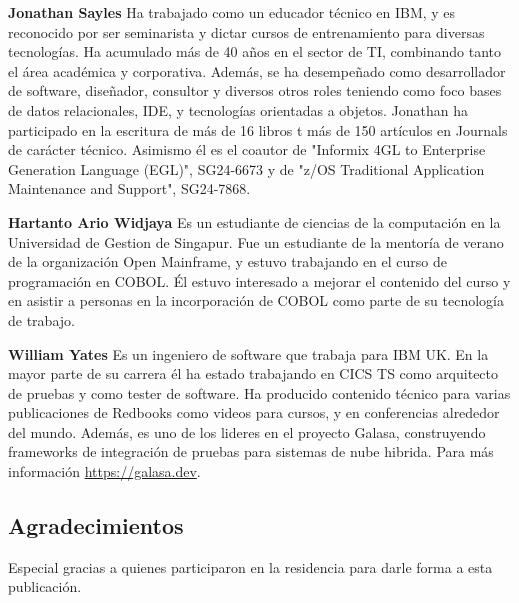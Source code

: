 \textbf{Jonathan Sayles} Ha trabajado como un educador técnico en IBM,
y es reconocido por ser seminarista y dictar cursos de entrenamiento para
diversas tecnologías. Ha acumulado más de 40 años en el sector de TI,
combinando tanto el área académica y corporativa. Además, se ha desempeñado
como desarrollador de software, diseñador, consultor y diversos otros
roles teniendo como foco bases de datos relacionales, IDE, y tecnologías
orientadas a objetos. Jonathan ha participado en la escritura de más de 16
libros t más de 150 artículos en Journals de carácter técnico. Asimismo
él es el coautor de "Informix 4GL to Enterprise Generation
Language (EGL)", SG24-6673 y de "z/OS Traditional Application Maintenance
and Support", SG24-7868.

\textbf{Hartanto Ario Widjaya} Es un estudiante de ciencias de la computación en
la Universidad de Gestion de Singapur. Fue un estudiante de la mentoría de verano
de la organización Open Mainframe, y estuvo trabajando en el curso de programación
en COBOL. Él estuvo interesado a mejorar el contenido del curso y en asistir
a personas en la incorporación de COBOL como parte de su tecnología de trabajo.

\textbf{William Yates} Es un ingeniero de software que trabaja para IBM UK.
En la mayor parte de su carrera él ha estado trabajando en CICS TS como
arquitecto de pruebas y como tester de software. Ha producido contenido técnico
para varias publicaciones de Redbooks como videos para cursos, y en conferencias
alrededor del mundo. Además, es uno de los lideres en el proyecto Galasa,
construyendo frameworks de integración de pruebas para sistemas de nube hibrida.
Para más información \href{https://galasa.dev/}{https://galasa.dev}.

\hypertarget{acknowledgements}{%
\subsection*{Agradecimientos}\label{acknowledgements}}

Especial gracias a quienes participaron en la residencia para darle forma a esta publicación.

